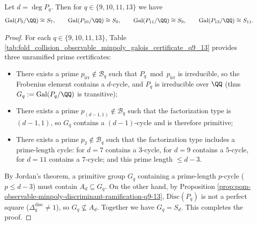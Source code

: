 \begin{proposition}[Maximal Galois Group of High-Order Recurrence: \texorpdfstring{$\mathrm{Gal}(P_q/\QQ)\cong S_d$}{Gal(Pq/Q)=Sd} (\(q=9,10,11,13\), Auditable)]\label{prop:pom-observable-minpoly-galois-sd-q9-13}
Let \(d=\deg P_q\).
Then for \(q\in\{9,10,11,13\}\) we have
\[
\mathrm{Gal}(P_9/\QQ)\cong S_7,\qquad
\mathrm{Gal}(P_{10}/\QQ)\cong S_9,\qquad
\mathrm{Gal}(P_{11}/\QQ)\cong S_9,\qquad
\mathrm{Gal}(P_{13}/\QQ)\cong S_{11}.
\]
\end{proposition}
\begin{proof}
For each \(q\in\{9,10,11,13\}\), Table \ref{tab:fold_collision_observable_minpoly_galois_certificate_q9_13} provides three unramified prime certificates:
\begin{itemize}
  \item There exists a prime \(p_{\mathrm{irr}}\notin\mathcal{B}_q\) such that \(P_q\bmod p_{\mathrm{irr}}\) is irreducible, so the Frobenius element contains a \(d\)-cycle, and \(P_q\) is irreducible over \(\QQ\) (thus \(G_q:=\mathrm{Gal}(P_q/\QQ)\) is transitive);
  \item There exists a prime \(p_{(d-1,1)}\notin\mathcal{B}_q\) such that the factorization type is \((d-1,1)\), so \(G_q\) contains a \((d-1)\)-cycle and is therefore primitive;
  \item There exists a prime \(p_{\mathrm{J}}\notin\mathcal{B}_q\) such that the factorization type includes a prime-length cycle: for \(d=7\) contains a \(3\)-cycle, for \(d=9\) contains a \(5\)-cycle, for \(d=11\) contains a \(7\)-cycle; and this prime length \(\le d-3\).
\end{itemize}
By Jordan's theorem, a primitive group \(G_q\) containing a prime-length \(p\)-cycle (\(p\le d-3\)) must contain \(A_d\subseteq G_q\).
On the other hand, by Proposition \ref{prop:pom-observable-minpoly-discriminant-ramification-q9-13}, \(\mathrm{Disc}(P_q)\) is not a perfect square (\(\Delta_q^{\mathrm{disc}}\neq 1\)), so \(G_q\not\subseteq A_d\).
Together we have \(G_q=S_d\). This completes the proof.
\end{proof}


